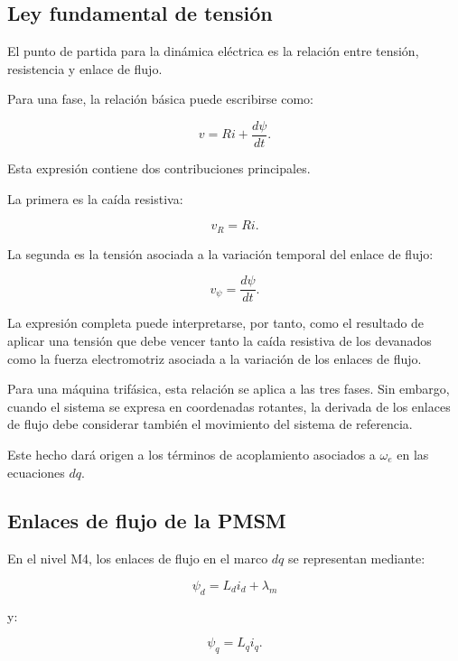 \subsection{Ley fundamental de tensión}

El punto de partida para la dinámica eléctrica es la relación entre tensión, resistencia y enlace de flujo.

Para una fase, la relación básica puede escribirse como:

\begin{equation}
v=Ri+\frac{d\psi}{dt}.
\end{equation}

Esta expresión contiene dos contribuciones principales.

La primera es la caída resistiva:

\begin{equation}
v_R=Ri.
\end{equation}

La segunda es la tensión asociada a la variación temporal del enlace de flujo:

\begin{equation}
v_{\psi}=\frac{d\psi}{dt}.
\end{equation}

La expresión completa puede interpretarse, por tanto, como el resultado de aplicar una tensión que debe vencer tanto la caída resistiva de los devanados como la fuerza electromotriz asociada a la variación de los enlaces de flujo.

Para una máquina trifásica, esta relación se aplica a las tres fases. Sin embargo, cuando el sistema se expresa en coordenadas rotantes, la derivada de los enlaces de flujo debe considerar también el movimiento del sistema de referencia.

Este hecho dará origen a los términos de acoplamiento asociados a $\omega_e$ en las ecuaciones $dq$.

\subsection{Enlaces de flujo de la PMSM}

En el nivel M4, los enlaces de flujo en el marco $dq$ se representan mediante:

\begin{equation}
\psi_d=L_di_d+\lambda_m
\end{equation}

y:

\begin{equation}
\psi_q=L_qi_q.
\end{equation}

